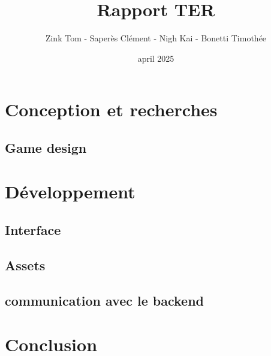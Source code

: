 \documentclass[french,a4paper,10pt]{article}
\title{\color{astral} \sffamily \bfseries Rapport TER}
\author{Zink Tom - Saperès Clément - Nigh Kai - Bonetti Timothée}
\date{april 2025}
\begin{document}
\maketitle

\hypersetup{
    hidelinks           %
}

\tableofcontents


\newpage


    

\newpage



\section{Conception et recherches}
    \subsection{Game design}
    
    
    
        
        


\section{Développement}
    
    
    

    \subsection{Interface}

    \subsection{Assets}
    
    
    
        
        
    \subsection{communication avec le backend}

\section{Conclusion}
\end{document}
